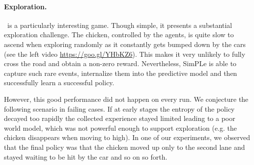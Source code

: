 \paragraph{Exploration.}  \freeway\, is a particularly interesting game. Though simple, it presents a substantial exploration challenge. The chicken, controlled by the agents, is quite slow to ascend when exploring randomly as it constantly gets bumped down by the cars (see the left video \url{https://goo.gl/YHbKZ6}). This makes it very unlikely to fully cross the road and obtain a non-zero reward. Nevertheless, SimPLe is able to capture such rare events, internalize them into the predictive model and then successfully learn a successful policy.

However, this good performance did not happen on every run. We conjecture the following scenario in failing cases. If at early stages the entropy of the policy decayed too rapidly the collected experience stayed limited leading to a poor world model, which was not powerful enough to support exploration (e.g. the chicken disappears when moving to high). In one of our experiments, we observed that the final policy was that the chicken moved up only to the second lane and stayed waiting to be hit by the car and so on so forth. 








